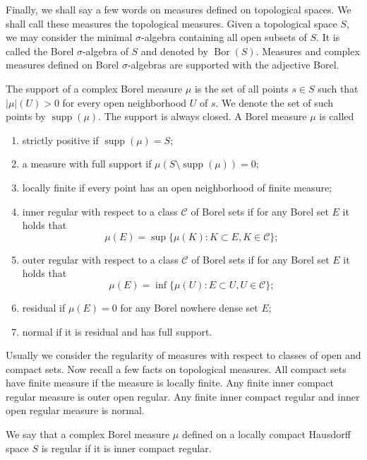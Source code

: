 Finally, we shall say a few words on measures defined on topological spaces. We
shall call these measures the topological measures. Given a topological space $S$, we may 
consider the minimal $\sigma$-algebra containing all open subsets of $S$. 
It is called the Borel $\sigma$-algebra of $S$ and denoted by $\operatorname{Bor}(S)$. 
Measures and complex measures defined on Borel $\sigma$-algebras are supported 
with the adjective Borel.

The support of a complex Borel measure $\mu$ is the set of all points
$s\in S$ such that $|\mu|(U)>0$ for every open neighborhood $U$ of $s$. We
denote the set of such points by $\operatorname{supp}(\mu)$. The support is
always closed. A Borel measure $\mu$ is called
\begin{enumerate}[label = (\roman*)]
  \item strictly positive if $\operatorname{supp}(\mu)=S$;

  \item a measure with full support 
  if $\mu(S\setminus\operatorname{supp}(\mu))=0$;

  \item locally finite if every point has an open neighborhood of finite measure; 

  \item inner regular with respect to a
  class $\mathcal{C}$ of Borel sets if for any Borel set $E$ it holds that 
  \[
  \mu(E)=\sup \{\mu(K): K\subset E, K\in\mathcal{C} \};
  \]

  \item outer regular with respect to a 
  class $\mathcal{C}$ of Borel sets if for any Borel set $E$ it holds that 
  \[
  \mu(E)=\inf \{\mu(U): E\subset U, U\in\mathcal{C} \};
  \]

  \item residual if $\mu(E)=0$ for any Borel nowhere dense set $E$;

  \item normal if it is residual and has full support.
\end{enumerate}

Usually we consider the regularity of measures with respect to classes of open and
compact sets. Now recall a few facts on topological measures. All compact sets 
have finite measure if the measure is locally finite. Any finite inner compact 
regular measure is outer open regular. Any finite inner compact regular and
inner open regular measure is normal. 

We say that a complex Borel measure $\mu$ defined on a 
locally compact Hausdorff space $S$ is regular if it is inner compact regular.  

